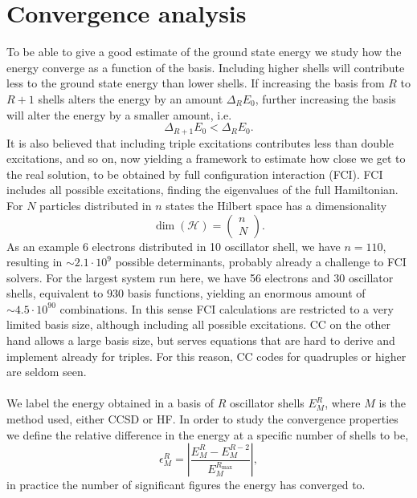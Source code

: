 \section{Convergence analysis}
To be able to give a good estimate of the ground state energy we study how the energy converge as a function of the basis.
Including higher shells will contribute less to the ground state energy than lower shells.
If increasing the basis from $R$ to $R+1$ shells alters the energy by an amount $\Delta_{R} E_0$, further increasing the basis will alter the energy by a smaller amount, i.e.
\begin{equation}
\Delta_{R+1} E_0 < \Delta_{R} E_0 .
\end{equation}
It is also believed that including triple excitations contributes less than double excitations, and so on, now yielding a framework to estimate how close we get to the real solution, to be obtained by full configuration interaction (FCI).
FCI includes all possible excitations, finding the eigenvalues of the full Hamiltonian.
For $N$ particles distributed in $n$ states the Hilbert space has a dimensionality
\begin{equation}
\dim(\mathcal{H}) = 
\begin{pmatrix}
n \\ 
N
\end{pmatrix} .
\end{equation}
As an example 6 electrons distributed in 10 oscillator shell, we have $n=110$, resulting in $\sim 2.1 \cdot 10^9$ possible determinants, probably already a challenge to FCI solvers.
For the largest system run here, we have 56 electrons and 30 oscillator shells, equivalent to $930$ basis functions, yielding an enormous amount of $\sim 4.5 \cdot 10^{90}$ combinations. 
In this sense FCI calculations are restricted to a very limited basis size, although including all possible excitations.
CC on the other hand allows a large basis size, but serves equations that are hard to derive and implement already for triples.
For this reason, CC codes for quadruples or higher are seldom seen.

\paragraph{}
We label the energy obtained in a basis of $R$ oscillator shells $E_{M}^{R}$, where $M$ is the method used, either CCSD or HF.
In order to study the convergence properties we define the relative difference in the energy at a specific number of shells to be,
\begin{equation}
\epsilon_M^R = \left| \frac{E_M^R - E_M^{R-2}}{E_M^{R_{\textrm{max}}}}  \right| , 
\end{equation}
in practice the number of significant figures the energy has converged to.

